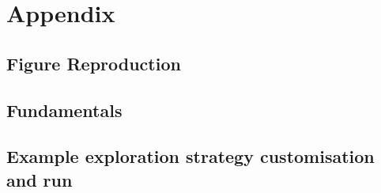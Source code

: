 \appendix
\part*{Appendix}
\chapter{Figure Reproduction}\label{apdx:figure_repoduction}


\chapter{Fundamentals}\label{apdx:fundamentals}


\chapter{Example exploration strategy customisation and run}\label{apdx:software_eg}

